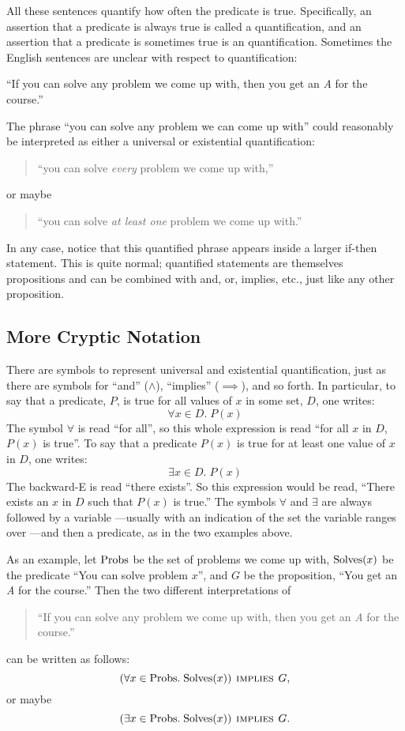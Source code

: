 All these sentences quantify how often the predicate is true.
Specifically, an assertion that a predicate is always true is called a
 quantification, and an assertion that a predicate is
sometimes true is an  quantification.  Sometimes the
English sentences are unclear with respect to quantification:
%
\begin{center}
  ``If you can solve any problem we come up with, then you get an \emph{A}
  for the course.''
\end{center}
%
The phrase ``you can solve any problem we can come up with'' could
reasonably be interpreted as either a universal or existential
quantification:
%
\begin{quote}
``you can solve \textit{every} problem we come up with,''
\end{quote}
or maybe
\begin{quote}
``you can solve \textit{at least one} problem we come up with.''
\end{quote}
%
In any case, notice that this quantified phrase appears inside a
larger if-then statement.  This is quite normal; quantified statements
are themselves propositions and can be combined with and, or, implies,
etc., just like any other proposition.

\subsection{More Cryptic Notation}

There are symbols to represent universal and existential
quantification, just as there are symbols for ``and'' ($\wedge$),
``implies'' ($\implies$), and so forth.  In particular, to say that a
predicate, $P$, is true for all values of $x$ in some set, $D$, one
writes:
%
\[
\forall x \in D.\; P(x)
\]
%
The symbol $\forall$ is read ``for all'', so this whole expression is
read ``for all $x$ in $D$, $P(x)$ is true''.  To say that a predicate
$P(x)$ is true for at least one value of $x$ in $D$, one writes:
%
\[
\exists x \in D.\; P(x)
\]
%
The backward-E is read ``there exists''.  So this expression would be
read, ``There exists an $x$ in $D$ such that $P(x)$ is true.''  The
symbols $\forall$ and $\exists$ are always followed by a variable
---usually with an indication of the set the variable ranges over ---and
then a predicate, as in the two examples above.

As an example, let $\text{Probs}$ be the set of problems we come up with,
$\text{Solves}(x)$ be the predicate ``You can solve problem $x$'', and $G$ be
the proposition, ``You get an \emph{A} for the course.''  Then the two
different interpretations of
%
\begin{quote}
``If you can solve any problem we come up with, then you get an \emph{A} for the course.''
\end{quote}
%
can be written as follows:
%
\[
(\forall x \in \text{Probs}.\; \text{Solves}(x)) \mathbin{\mathrm{\textsc{\,implies\,}}} G,
\]
or maybe
\[
(\exists x \in \text{Probs}.\; \text{Solves}(x)) \mathbin{\mathrm{\textsc{\,implies\,}}} G.
\]

